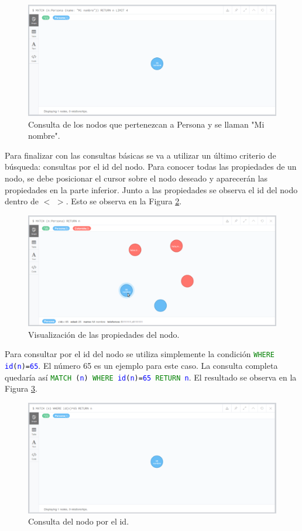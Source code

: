 \documentclass[conference]{IEEEtran}
\begin{document}
\begin{figure}[H]
\begin{center}
\includegraphics[width= 0.45 \textwidth]{consulta_label2.png}
\end{center}
\caption{Consulta de los nodos que pertenezcan a Persona y se llaman "Mi nombre".}
\label{fig23}
\end{figure}

Para finalizar con las consultas básicas se va a utilizar un último criterio de búsqueda: consultas por el id del nodo. Para conocer todas las propiedades de un nodo, se debe posicionar el cursor sobre el nodo deseado y aparecerán las propiedades en la parte inferior. Junto a las propiedades se observa el id del nodo dentro de $<$ $>$. Esto se observa en la Figura \ref{fig24}.

\begin{figure}[H]
\begin{center}
\includegraphics[width= 0.45 \textwidth]{nodo_id.png}
\end{center}
\caption{Visualización de las propiedades del nodo.}
\label{fig24}
\end{figure}

Para consultar por el id del nodo se utiliza simplemente la condición \texttt{\textcolor{green}{WHERE} \textcolor{blue}{id}(\textcolor{blue}{n})=\textcolor{blue}{65}}. El número 65 es un ejemplo para este caso. La consulta completa quedaría así \texttt{\textcolor{green}{MATCH} (\textcolor{blue}{n}) \textcolor{green}{WHERE} \textcolor{blue}{id}(\textcolor{blue}{n})=\textcolor{blue}{65} \textcolor{green}{RETURN} \textcolor{blue}{n}}. El resultado se observa en la Figura \ref{fig25}.

\begin{figure}[H]
\begin{center}
\includegraphics[width= 0.45 \textwidth]{consulta_id.png}
\end{center}
\caption{Consulta del nodo por el id.}
\label{fig25}
\end{figure}
\end{document}
